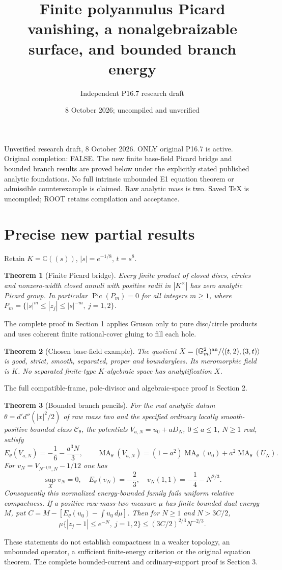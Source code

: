 \documentclass[11pt]{article}
\title{Finite polyannulus Picard vanishing, a nonalgebraizable surface, and bounded branch energy}
\author{Independent P16.7 research draft}
\date{8 October 2026; uncompiled and unverified}
\newtheorem{theorem}{Theorem}
\begin{document}
\maketitle
Unverified research draft, 8 October 2026. ONLY original P16.7 is active. Original completion: FALSE. The new finite base-field Picard bridge and bounded branch results are proved below under the explicitly stated published analytic foundations. No full intrinsic unbounded E1 equation theorem or admissible counterexample is claimed. Raw analytic mass is two. Saved TeX is uncompiled; ROOT retains compilation and acceptance.

\section*{Precise new partial results}
Retain $K=\mathbb C((s))$, $|s|=e^{-1/8}$, $t=s^8$.
\begin{theorem}[Finite Picard bridge]
Every finite product of closed discs, circles and nonzero-width closed annuli
with positive radii in $|K^\times|$ has zero analytic Picard group.
In particular $\operatorname{Pic}(P_m)=0$ for all integers $m\geq1$,
where $P_m=\{|s|^m\leq|z_j|\leq|s|^{-m},\ j=1,2\}$.
\end{theorem}
The complete proof in Section 1 applies Gruson only to pure disc/circle products
and uses coherent finite rational-cover gluing to fill each hole.
\begin{theorem}[Chosen base-field example]
The quotient $X=(\mathbb G_m^2)^{\rm an}/\langle(t,2),(3,t)\rangle$ is good,
strict, smooth, separated, proper and boundaryless. Its meromorphic field is $K$.
No separated finite-type $K$-algebraic space has analytification $X$.
\end{theorem}
The full compatible-frame, pole-divisor and algebraic-space proof is Section 2.
\begin{theorem}[Bounded branch pencils]
For the real analytic datum $\theta=d'd''(|x|^2/2)$ of raw mass two and the
specified ordinary locally smooth-positive bounded class $\mathcal C_\theta$,
the potentials $V_{a,N}=u_0+aD_N$, $0\leq a\leq1$, $N\geq1$ real, satisfy
\[
 E_\theta(V_{a,N})=-\frac16-\frac{a^3N}{3},\qquad
 \operatorname{MA}_\theta(V_{a,N})=(1-a^2)\operatorname{MA}_\theta(u_0)
      +a^2\operatorname{MA}_\theta(U_N).
\]
For $v_N=V_{N^{-1/3},N}-1/12$ one has
\[
 \sup_Xv_N=0,\quad E_\theta(v_N)=-\frac23,\quad
 v_N(1,1)=-\frac14-N^{2/3}.
\]
Consequently this normalized energy-bounded family fails uniform relative compactness.
If a positive raw-mass-two measure $\mu$ has finite bounded dual energy $M$,
put $C=M-[E_\theta(u_0)-\int u_0\,d\mu]$. Then for $N\geq1$ and $N>3C/2$,
\[
 \mu\{ |z_j-1|\leq e^{-N},\ j=1,2\}
 \leq (3C/2)^{2/3}N^{-2/3}.
\]
\end{theorem}
These statements do not establish compactness in a weaker topology,
an unbounded operator, a sufficient finite-energy criterion or the original equation theorem.
The complete bounded-current and ordinary-support proof is Section 3.
\end{document}
